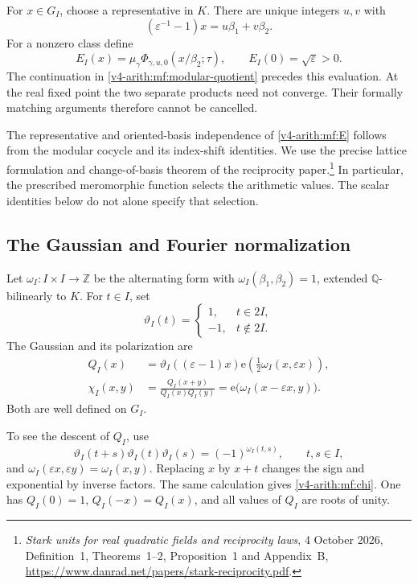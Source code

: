 For \(x\in G_I\), choose a representative in \(K\).
There are unique integers \(u,v\) with
\[
 (\varepsilon^{-1}-1)x=u\beta_1+v\beta_2.
\]
For a nonzero class define
\begin{equation}\label{v4-arith:mf:E}
 E_I(x)=
 \mu_\gamma\Phi_{\gamma,u,0}(x/\beta_2;\tau),
 \qquad E_I(0)=\sqrt{\varepsilon}>0.
\end{equation}
The continuation in
\eqref{v4-arith:mf:modular-quotient} precedes this evaluation.
At the real fixed point the two separate products need not converge.
Their formally matching arguments therefore cannot be cancelled.

The representative and oriented-basis independence of
\eqref{v4-arith:mf:E} follows from the modular cocycle and its
index-shift identities. We use the precise lattice formulation and
change-of-basis theorem of the reciprocity paper.\footnote{
\emph{Stark units for real quadratic fields and reciprocity laws},
4 October 2026, Definition~1, Theorems~1--2, Proposition~1
and Appendix~B,
\url{https://www.danrad.net/papers/stark-reciprocity.pdf}.}
In particular, the prescribed meromorphic function selects the
arithmetic values. The scalar identities below do not alone specify
that selection.

\subsection{The Gaussian and Fourier normalization}

Let \(\omega_I:I\times I\to\mathbb Z\) be the alternating form with
\(\omega_I(\beta_1,\beta_2)=1\), extended
\(\mathbb Q\)-bilinearly to \(K\).
For \(t\in I\), set
\[
 \vartheta_I(t)=
 \begin{cases}
  1,&t\in2I,\\
  -1,&t\notin2I.
 \end{cases}
\]
The Gaussian and its polarization are
\begin{align}
 Q_I(x)
 &=\vartheta_I((\varepsilon-1)x)
       \mathrm e\!\left(\tfrac12\omega_I(x,\varepsilon x)\right),
       \label{v4-arith:mf:gaussian}\\
 \chi_I(x,y)
 &=\frac{Q_I(x+y)}{Q_I(x)Q_I(y)}
   =\mathrm e\bigl(\omega_I(x-\varepsilon x,y)\bigr).
       \label{v4-arith:mf:chi}
\end{align}
Both are well defined on \(G_I\).

To see the descent of \(Q_I\), use
\[
 \vartheta_I(t+s)\vartheta_I(t)\vartheta_I(s)
       =(-1)^{\omega_I(t,s)},\qquad t,s\in I,
\]
and \(\omega_I(\varepsilon x,\varepsilon y)=\omega_I(x,y)\).
Replacing \(x\) by \(x+t\) changes the sign and exponential
by inverse factors. The same calculation gives
\eqref{v4-arith:mf:chi}.
One has \(Q_I(0)=1\), \(Q_I(-x)=Q_I(x)\), and all values
of \(Q_I\) are roots of unity.

